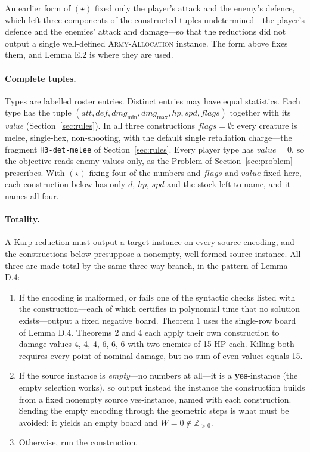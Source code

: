 \documentclass[11pt,a4paper]{article}
\theoremstyle{plain}
\theoremstyle{definition}
\theoremstyle{plain}
\theoremstyle{definition}
\theoremstyle{remark}
\newcommand{\ALLOC}{\textsc{Army-Allocation}}
\begin{document}
An earlier form of $(\star)$ fixed only the player's attack and the enemy's defence, which
left three components of the constructed tuples undetermined---the player's defence and the
enemies' attack and damage---so that the reductions did not output a single well-defined
\ALLOC{} instance. The form above fixes them, and Lemma E.2 is where they are used.

\paragraph{Complete tuples.} Types are labelled roster entries. Distinct entries may have equal statistics. Each type has the tuple
$(\mathit{att},\mathit{def},\mathit{dmg}_{\min},\mathit{dmg}_{\max},\mathit{hp},
\mathit{spd},\mathit{flags})$ together with its \emph{value} (Section~\ref{sec:rules}).
In all three constructions $\mathit{flags}=\emptyset$: every creature is melee, single-hex,
non-shooting, with the default single retaliation charge---the fragment
\texttt{H3-det-melee} of Section~\ref{sec:rules}. Every player type has $\mathit{value}=0$,
so the objective reads enemy values only, as the Problem of Section~\ref{sec:problem}
prescribes. With $(\star)$ fixing four of the numbers and $\mathit{flags}$ and
$\mathit{value}$ fixed here, each construction below has only $d$, $\mathit{hp}$,
$\mathit{spd}$ and the stock left to name, and it names all four.

\paragraph{Totality.} A Karp reduction must output a target instance on every source
encoding, and the constructions below presuppose a nonempty, well-formed source instance.
All three are made total by the same three-way branch, in the pattern of Lemma D.4:

\begin{enumerate}
\item If the encoding is malformed, or fails one of the syntactic checks listed with the
  construction---each of which certifies in polynomial time that no solution exists---output
  a fixed negative board. Theorem 1 uses the single-row board of Lemma D.4. Theorems 2 and 4 each apply their own construction to damage values 4, 4, 4, 6, 6, 6 with two enemies of 15 HP each. Killing both requires every point of nominal damage, but no sum of even values equals 15.
\item If the source instance is \emph{empty}---no numbers at all---it is a
  \textbf{yes}-instance (the empty selection works), so output instead the instance the
  construction builds from a fixed nonempty source yes-instance, named with each
  construction. Sending the empty encoding through the geometric steps is what must be
  avoided: it yields an empty board and $W=0\notin\mathbb{Z}_{>0}$.
\item Otherwise, run the construction.
\end{enumerate}
\end{document}
